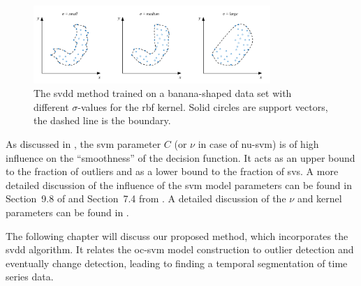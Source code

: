 \begin{figure}
  \centering
    \includegraphics[width=0.8\textwidth,keepaspectratio]{./Figures/chapter3/svdd-parameter-sigma.pdf}
  \caption[\gls{svdd} boundary]{The \gls{svdd} method trained on a banana-shaped data set with different $\sigma$-values for the \gls{rbf} kernel. Solid circles are support vectors, the dashed line is the boundary.}
  \label{fig:svdd-boundary-sigma}
\end{figure}

As discussed in , the \gls{svm} parameter $C$ (or $\nu$ in case of \gls{nu-svm}) is of high influence on the ``smoothness'' of the decision function.
It acts as an upper bound to the fraction of outliers and as a lower bound to the fraction of \glspl{sv}.
A more detailed discussion of the influence of the \gls{svm} model parameters can be found in Section~9.8 of \cite{cherkassky2007learning} and Section~7.4 from \cite{flach2012machine}.
A detailed discussion of the $\nu$ and kernel parameters can be found in \cite{scholkopf2002learning}.

The following chapter will discuss our proposed method, which incorporates the \gls{svdd} algorithm.
It relates the \gls{oc-svm} model construction to outlier detection and eventually change detection, leading to finding a temporal segmentation of time series data.






